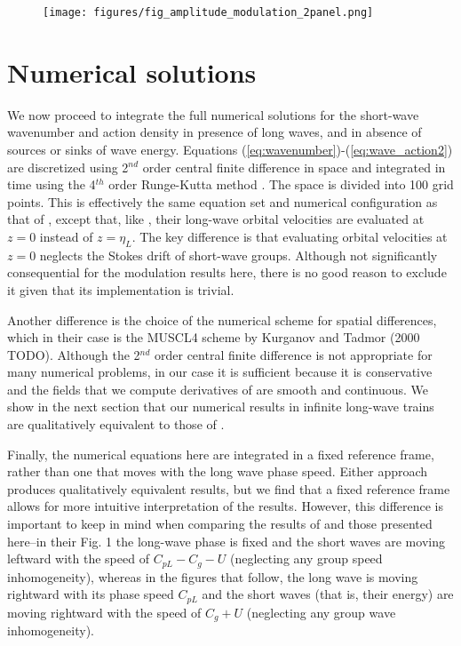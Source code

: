 \documentclass[draft]{agujournal2019}
\begin{document}
\begin{figure}[h]
\label{fig:amplitude_modulation}
\centering
\texttt{[image: figures/fig\_amplitude\_modulation\_2panel.png]}
\caption{
}
\end{figure}

\section{Numerical solutions}
\label{section:numerical_solutions}

We now proceed to integrate the full numerical solutions for the short-wave
wavenumber and action density in presence of long waves, and in absence of
sources or sinks of wave energy.
Equations (\ref{eq:wavenumber})-(\ref{eq:wave_action2}) are discretized using
2$^{nd}$  order central finite difference in space and integrated in time using the
4$^{th}$ order Runge-Kutta method \cite{butcher1996runge}.
The space is divided into 100 grid points.
This is effectively the same equation set and numerical configuration as that of
, except that, like , their
long-wave orbital velocities are evaluated at $z=0$ instead of $z=\eta_L$.
The key difference is that evaluating orbital velocities at $z=0$ neglects the
Stokes drift of short-wave groups.
Although not significantly consequential for the modulation results here, there
is no good reason to exclude it given that its implementation is trivial.

Another difference is the choice of the numerical scheme for spatial differences,
which in their case is the MUSCL4 scheme by Kurganov and Tadmor (2000 TODO).
Although the 2$^{nd}$ order central finite difference is not appropriate for many
numerical problems, in our case it is sufficient because it is conservative and
the fields that we compute derivatives of are smooth and continuous.
We show in the next section that our numerical results in infinite long-wave
trains are qualitatively equivalent to those of .

Finally, the numerical equations here are integrated in a fixed reference frame,
rather than one that moves with the long wave phase speed.
Either approach produces qualitatively equivalent results, but we find that
a fixed reference frame allows for more intuitive interpretation of the results.
However, this difference is important to keep in mind when comparing the results
of  and those presented here--in their Fig. 1 the
long-wave phase is fixed and the short waves are moving leftward
with the speed of $C_{pL} - C_g - U$ (neglecting any group speed inhomogeneity),
whereas in the figures that follow, the long wave is moving rightward with its
phase speed $C_{pL}$ and the short waves (that is, their energy) are moving
rightward with the speed of $C_g + U$ (neglecting any group wave inhomogeneity).
\end{document}
